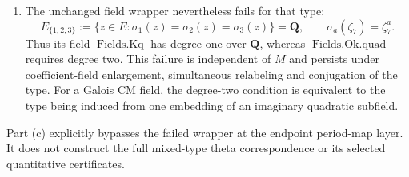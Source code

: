 \begin{proposition}
\begin{enumerate}[label=(\alph*),leftmargin=*]
endpoint period and inner-product formula at every admissible rebuilt rank.
This assertion does not say that the period is nonzero on a prescribed
iterated theta image.
\item The unchanged field wrapper nevertheless fails for that type:
\[
 E_{\{1,2,3\}}
 :=\{z\in E:\sigma_1(z)=\sigma_2(z)=\sigma_3(z)\}
 =\mathbf Q,
 \qquad \sigma_a(\zeta_7)=\zeta_7^a.
\]
Thus its field $\operatorname{Fields.Kq}$ has degree one over $\mathbf Q$,
whereas $\operatorname{Fields.Ok.quad}$ requires degree two.
This failure is independent of $M$ and persists under coefficient-field
enlargement, simultaneous relabeling and conjugation of the type.
For a Galois CM field, the degree-two condition is equivalent to the type
being induced from one embedding of an imaginary quadratic subfield.
\end{enumerate}
Part (c) explicitly bypasses the failed wrapper at the endpoint period-map
layer. It does not construct the full mixed-type theta correspondence or
its selected quantitative certificates.
\end{proposition}

